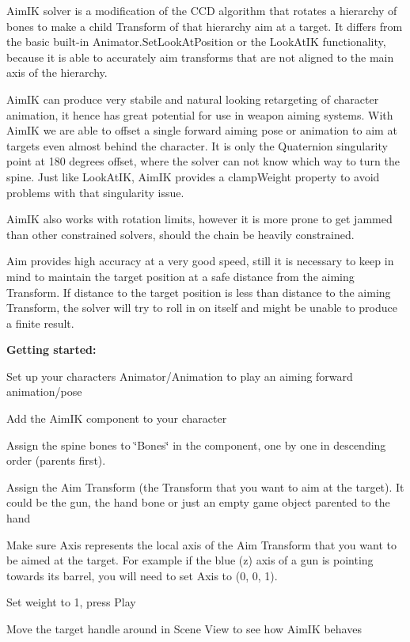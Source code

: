 Aim\+IK solver is a modification of the C\+CD algorithm that rotates a hierarchy of bones to make a child Transform of that hierarchy aim at a target. It differs from the basic built-\/in Animator.\+Set\+Look\+At\+Position or the Look\+At\+IK functionality, because it is able to accurately aim transforms that are not aligned to the main axis of the hierarchy.

Aim\+IK can produce very stabile and natural looking retargeting of character animation, it hence has great potential for use in weapon aiming systems. With Aim\+IK we are able to offset a single forward aiming pose or animation to aim at targets even almost behind the character. It is only the Quaternion singularity point at 180 degrees offset, where the solver can not know which way to turn the spine. Just like Look\+At\+IK, Aim\+IK provides a clamp\+Weight property to avoid problems with that singularity issue.

Aim\+IK also works with rotation limits, however it is more prone to get jammed than other constrained solvers, should the chain be heavily constrained.

Aim provides high accuracy at a very good speed, still it is necessary to keep in mind to maintain the target position at a safe distance from the aiming Transform. If distance to the target position is less than distance to the aiming Transform, the solver will try to roll in on itself and might be unable to produce a finite result.

 {\bfseries Getting started\+:}
\begin{DoxyItemize}
\item Set up your character\textquotesingle{}s Animator/\+Animation to play an aiming forward animation/pose
\item Add the Aim\+IK component to your character
\item Assign the spine bones to \char`\"{}\+Bones\char`\"{} in the component, one by one in descending order (parents first).
\item Assign the Aim Transform (the Transform that you want to aim at the target). It could be the gun, the hand bone or just an empty game object parented to the hand
\item Make sure Axis represents the local axis of the Aim Transform that you want to be aimed at the target. For example if the blue (z) axis of a gun is pointing towards it\textquotesingle{}s barrel, you will need to set Axis to (0, 0, 1).
\item Set weight to 1, press Play
\item Move the target handle around in Scene View to see how Aim\+IK behaves
\end{DoxyItemize}

